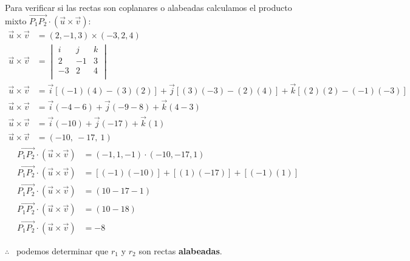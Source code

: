 \noindent Para verificar si las rectas son coplanares o alabeadas calculamos el producto mixto $\overrightarrow{P_1P_2} \cdot (\vec{u} \times \vec{v})$:
\begin{align*}
	\vec{u} \times \vec{v} & = (2, -1, 3) \times (-3, 2, 4)                                                          \\
	\vec{u} \times \vec{v} & = \begin{vmatrix}
		                           i  & j  & k \\
		                           2  & -1 & 3 \\
		                           -3 & 2  & 4 \\
	                           \end{vmatrix}                                                                        \\
	\vec{u} \times \vec{v} & = \vec{i} [(-1)(4) - (3)(2)] + \vec{j} [(3)(-3) - (2)(4)] + \vec{k} [(2)(2) - (-1)(-3)] \\
	\vec{u} \times \vec{v} & = \vec{i} (-4 - 6) + \vec{j} (-9 - 8) + \vec{k} (4 - 3)                                 \\
	\vec{u} \times \vec{v} & = \vec{i} (-10) + \vec{j} (-17) + \vec{k} (1)                                           \\
	\vec{u} \times \vec{v} & = (-10, \ -17, \ 1)
\end{align*}
\begin{align*}
	\overrightarrow{P_1P_2} \cdot (\vec{u} \times \vec{v}) & = (-1, 1, -1) \cdot (-10, -17, 1)      \\
	\overrightarrow{P_1P_2} \cdot (\vec{u} \times \vec{v}) & = [(-1)(-10)] + [(1)(-17)] + [(-1)(1)] \\
	\overrightarrow{P_1P_2} \cdot (\vec{u} \times \vec{v}) & = (10 - 17 -1)                         \\
	\overrightarrow{P_1P_2} \cdot (\vec{u} \times \vec{v}) & = (10 - 18)                            \\
	\overrightarrow{P_1P_2} \cdot (\vec{u} \times \vec{v}) & = \boxed{- 8}
\end{align*}

\noindent $\therefore$ \ podemos determinar que $r_1$ y $r_2$ son rectas \textbf{alabeadas}.






